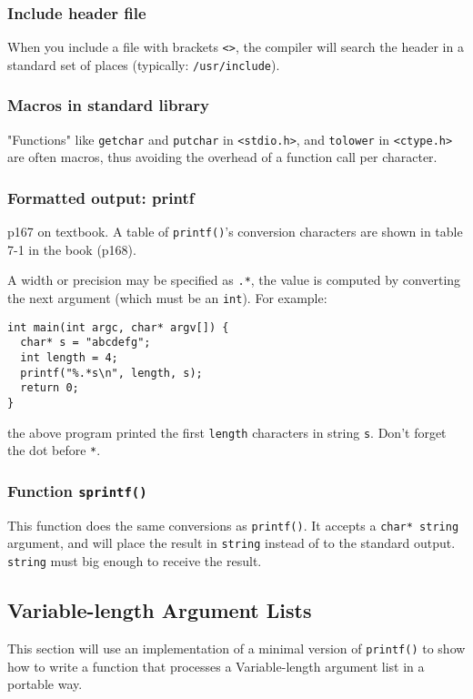 \documentclass[12pt]{article}
\begin{document}
\subsubsection{Include header file}
\label{sec:org172f403}
When you include a file with brackets \texttt{<>}, the compiler will search the header in a standard set of places (typically: \texttt{/usr/include}).

\subsubsection{Macros in standard library}
\label{sec:org4194adb}
"Functions" like \texttt{getchar} and \texttt{putchar} in \texttt{<stdio.h>}, and \texttt{tolower} in \texttt{<ctype.h>} are often macros, thus avoiding the overhead of a function call per character.

\subsubsection{Formatted output: printf}
\label{sec:orgdbb098d}
p167 on textbook. A table of \texttt{printf()}'s conversion characters are shown in table 7-1 in the book (p168).

A width or precision may be specified as \texttt{.*}, the value is computed by converting the next argument (which must be an \texttt{int}). For example:
\begin{verbatim}
int main(int argc, char* argv[]) {
  char* s = "abcdefg";
  int length = 4;
  printf("%.*s\n", length, s);
  return 0;
}
\end{verbatim}
the above program printed the first \texttt{length} characters in string \texttt{s}. Don't forget the dot before \texttt{*}.

\subsubsection{Function \texttt{sprintf()}}
\label{sec:org2ec1b63}
This function does the same conversions as \texttt{printf()}. It accepts a \texttt{char* string} argument, and will place the result in \texttt{string} instead of to the standard output. \texttt{string} must big enough to receive the result.

\subsection{Variable-length Argument Lists}
\label{sec:orgca56cbf}
This section will use an implementation of a minimal version of \texttt{printf()} to show how to write a function that processes a Variable-length argument list in a portable way.
\end{document}
